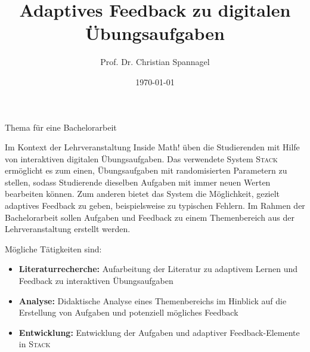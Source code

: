\documentclass{cssheet}
\title{Adaptives Feedback zu digitalen Übungsaufgaben}
\author{Prof. Dr. Christian Spannagel}
\date{\today}
\begin{document}
\vspace*{5mm}
\begin{center}
{\Large Thema für eine Bachelorarbeit}
\end{center}

\printtitle
\vspace*{1cm}

Im Kontext der Lehrveranstaltung \glqq{}Inside Math!\grqq{} üben die Studierenden mit Hilfe von interaktiven digitalen Übungsaufgaben. Das verwendete System \textsc{Stack} ermöglicht es zum einen, Übungsaufgaben mit randomisierten Parametern zu stellen, sodass Studierende dieselben Aufgaben mit immer neuen Werten bearbeiten können. Zum anderen bietet das System die Möglichkeit, gezielt adaptives Feedback zu geben, beispielsweise zu typischen Fehlern. Im Rahmen der Bachelorarbeit sollen Aufgaben und Feedback zu einem Themenbereich aus der Lehrveranstaltung erstellt werden.

Mögliche Tätigkeiten sind:
\begin{itemize}
\item \textbf{Literaturrecherche:} Aufarbeitung der Literatur zu adaptivem Lernen und Feedback zu interaktiven Übungsaufgaben
\item \textbf{Analyse:} Didaktische Analyse eines Themenbereichs im Hinblick auf die Erstellung von Aufgaben und potenziell mögliches Feedback
\item \textbf{Entwicklung:} Entwicklung der Aufgaben und adaptiver Feedback-Elemente in \textsc{Stack}
\end{itemize}

\vspace*{10mm}

\printlicense

\printsocials
\end{document}
